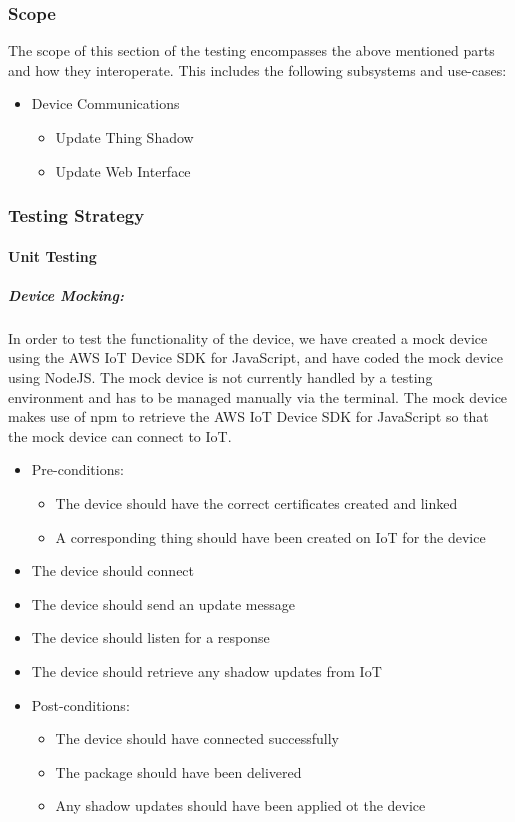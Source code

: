 \documentclass{article}
\begin{document}
	\subsubsection{Scope}
	The scope of this section of the testing encompasses the above mentioned parts and how they interoperate. This includes the following subsystems and use-cases:
	\begin{itemize}
		\item Device Communications
		\begin{itemize}
			\item Update Thing Shadow
			\item Update Web Interface
		\end{itemize}
	\end{itemize}
	
	\subsubsection{Testing Strategy}
	\paragraph{Unit Testing}
	\subparagraph{Device Mocking:}
	In order to test the functionality of the device, we have created a mock device using the AWS IoT Device SDK for JavaScript, and have coded the mock device using NodeJS. The mock device is not currently handled by a testing environment and has to be managed manually via the terminal. The mock device makes use of npm to retrieve the AWS IoT Device SDK for JavaScript so that the mock device can connect to IoT.
	\begin{itemize}
		\item Pre-conditions:
		\begin{itemize}
			\item The device should have the correct certificates created and linked
			\item A corresponding thing should have been created on IoT for the device
		\end{itemize}
		\item The device should connect
		\item The device should send an update message
		\item The device should listen for a response
		\item The device should retrieve any shadow updates from IoT
		\item Post-conditions:
		\begin{itemize}
			\item The device should have connected successfully
			\item The package should have been delivered 
			\item Any shadow updates should have been applied ot the device
		\end{itemize}
	\end{itemize}
	
\end{document}
